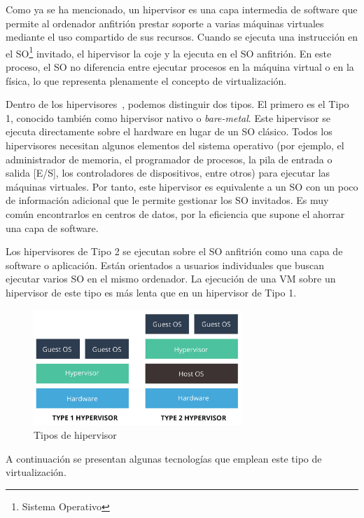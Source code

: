 	Como ya se ha mencionado, un hipervisor es una capa intermedia de software que permite al ordenador anfitrión prestar soporte a varias máquinas virtuales mediante el uso compartido de sus recursos. Cuando se ejecuta una instrucción en el SO\footnote{Sistema Operativo} invitado, el hipervisor la coje y la ejecuta en el SO anfitrión. En este proceso, el SO no diferencia entre ejecutar procesos en la máquina virtual o en la física, lo que representa plenamente el concepto de virtualización.

	Dentro de los hipervisores~\cite{virt3}, podemos distinguir dos tipos. El primero es el Tipo 1, conocido también como hipervisor nativo o \textit{bare-metal}. Este hipervisor se ejecuta directamente sobre el hardware en lugar de un SO clásico. Todos los hipervisores necesitan algunos elementos del sistema operativo (por ejemplo, el administrador de memoria, el programador de procesos, la pila de entrada o salida [E/S], los controladores de dispositivos, entre otros) para ejecutar las máquinas virtuales. Por tanto, este hipervisor es equivalente a un SO con un poco de información adicional que le permite gestionar los SO invitados. Es muy común encontrarlos en centros de datos, por la eficiencia que supone el ahorrar una capa de software.

	Los hipervisores de Tipo 2 se ejecutan sobre el SO anfitrión como una capa de software o aplicación. Están orientados a usuarios individuales que buscan ejecutar varios SO en el mismo ordenador. La ejecución de una VM sobre un hipervisor de este tipo es más lenta que en un hipervisor de Tipo 1.

	\begin{figure}[h]
	\centering
	\includegraphics[width=0.7\textwidth]{../imgs/EdA/hipervisor.jpg}
	\caption{Tipos de hipervisor}
	\label{fig:hipervtypes}
	\end{figure}

	A continuación se presentan algunas tecnologías que emplean este tipo de virtualización.
	\clearpage

